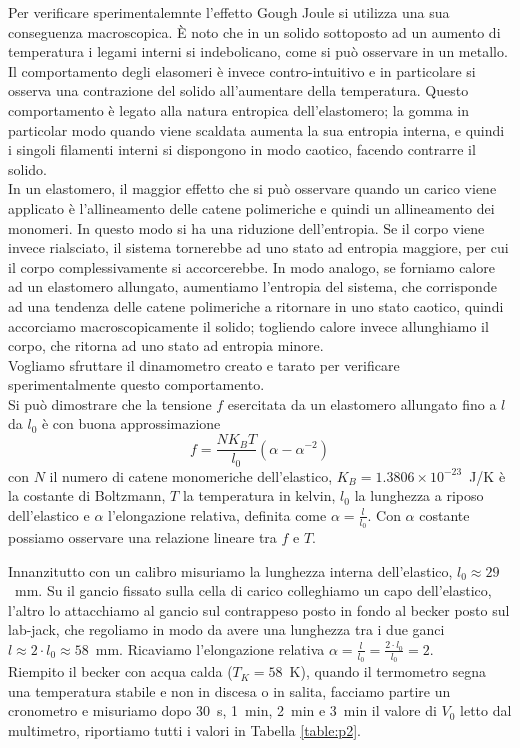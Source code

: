 \documentclass[italian, a4paper, 10pt, twocolumn]{../../style/lab_unige}
\newcommand{\reftab}[1]{Tabella {\ref{#1}}}%
\begin{document}
    Per verificare sperimentalemnte l'effetto Gough Joule si utilizza una sua conseguenza macroscopica. È noto che in un solido sottoposto ad un aumento di temperatura i legami interni si indebolicano, come si può osservare in un metallo. Il comportamento degli elasomeri è invece contro-intuitivo e in particolare si osserva una contrazione del solido all'aumentare della temperatura. Questo comportamento è legato alla natura entropica dell'elastomero; la gomma in particolar modo quando viene scaldata aumenta la sua entropia interna, e quindi i singoli filamenti interni si dispongono in modo caotico, facendo contrarre il solido. \\
    In un elastomero, il maggior effetto che si può osservare quando un carico viene applicato è l'allineamento delle catene polimeriche e quindi un allineamento dei monomeri. In questo modo si ha una riduzione dell'entropia. Se il corpo viene invece rialsciato, il sistema tornerebbe ad uno stato ad entropia maggiore, per cui il corpo complessivamente si accorcerebbe. In modo analogo, se forniamo calore ad un elastomero allungato, aumentiamo l'entropia del sistema, che corrisponde ad una tendenza delle catene polimeriche a ritornare in uno stato caotico, quindi accorciamo macroscopicamente il solido; togliendo calore invece allunghiamo il corpo, che ritorna ad uno stato ad entropia minore.\\
    Vogliamo sfruttare il dinamometro creato e tarato per verificare sperimentalmente questo comportamento.\\
    Si può dimostrare che la tensione $f$ esercitata da un elastomero allungato fino a $l$ da $l_0$ è con buona approssimazione
    \begin{equation}
        f=\frac{NK_BT}{l_0}\left(\alpha-\alpha^{-2}\right)
    \end{equation}
    con $N$ il numero di catene monomeriche dell'elastico, $K_B=1.3806\times10^{-23}$~J/K è la costante di Boltzmann, $T$ la temperatura in kelvin, $l_0$ la lunghezza a riposo dell'elastico e $\alpha$ l'elongazione relativa, definita come $\alpha=\frac{l}{l_{0}}$. Con $\alpha$ costante possiamo osservare una relazione lineare tra $f$ e $T$.
    
    
    Innanzitutto con un calibro misuriamo la lunghezza interna dell'elastico, $l_{0}\approx29$~mm. Su il gancio fissato sulla cella di carico colleghiamo un capo dell'elastico, l'altro lo attacchiamo al gancio sul contrappeso posto in fondo al becker posto sul lab-jack, che regoliamo in modo da avere una lunghezza tra i due ganci $l\approx2\cdot l_{0}\approx58$~mm. Ricaviamo l'elongazione relativa $\alpha=\frac{l}{l_{0}}=\frac{2\cdot l_0}{l_0}=2$.\\
    Riempito il becker con acqua calda ($T_K=58$~K), quando il termometro segna una temperatura stabile e non in discesa o in salita, facciamo partire un cronometro e misuriamo dopo 30~s, 1~min, 2~min e 3~min il valore di $V_0$ letto dal multimetro, riportiamo tutti i valori in \reftab{table:p2}.
    
\end{document}
